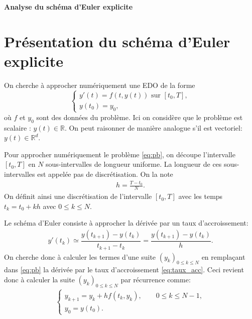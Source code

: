 \documentclass[12pt,a4paper,twoside]{article}
\begin{document}
\newtheorem{theorem}{Th\'eor\`eme}
\newtheorem{definition}{D\'efinition}
\newcommand*{\R}{\mathbb{R}}

\begin{center}
{\bf \Huge Analyse du sch\'ema d'Euler explicite}
\end{center}


\section{Pr\'esentation du sch\'ema d'Euler explicite}

On cherche \`a approcher num\'eriquement une EDO de la forme
\begin{equation}
  \label{eq:pb}
  \left\{
    \begin{array}{l}
      y'(t) = f(t,y(t)) \text{ sur } [t_0,T] ,
      \\
      y(t_0) = y_0 ,
    \end{array}
  \right.
\end{equation}
o\`u $f$ et $y_0$ sont des donn\'ees du probl\`eme.
Ici on consid\`ere que le probl\`eme est scalaire : $y(t) \in \R$.
On peut raisonner de mani\`ere analogue s'il est vectoriel:
$y(t) \in \R^d$.

Pour approcher num\'eriquement le probl\`eme \eqref{eq:pb}, on d\'ecoupe l'intervalle
$[t_0,T]$ en $N$ sous-intervalles de longueur uniforme.
La longueur de ces sous-intervalles est appel\'ee pas de discr\'etisation.
On la note
\begin{align*}
  h = \frac{T - t_0}{N} .
\end{align*}
On d\'efinit ainsi une discr\'etisation 
de l'intervalle $[t_0,T]$ avec les temps $t_k = t_0 + kh$ avec $0 \leq k \leq N$.


Le sch\'ema d'Euler consiste \`a approcher la d\'eriv\'ee par un taux d'accroissement:
\begin{align}
  \label{eq:taux_acc}
  y'(t_k) \simeq \dfrac{y(t_{k+1}) - y(t_k)}{t_{k+1} - t_k } = \dfrac{y(t_{k+1}) - y(t_k)}{h} .
\end{align}
On cherche donc \`a calculer les termes d'une suite $(y_k)_{0 \leq k \leq N}$
en rempla\c{c}ant dans \eqref{eq:pb} la d\'eriv\'ee par le taux d'accroissement
\eqref{eq:taux_acc}.
Ceci revient donc \`a calculer la suite $(y_k)_{0 \leq k \leq N}$ par r\'ecurrence comme:
\begin{align*}
  \left\{
  \begin{array}{l}
    y_{k+1} = y_k + h f(t_k , y_k), \qquad 0 \leq k \leq N-1 ,
    \\
    y_0 = y(t_0) .
  \end{array}
  \right.
\end{align*}
\end{document}
